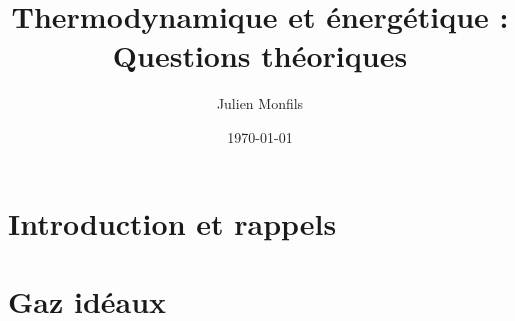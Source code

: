 \documentclass{article}
\title{Thermodynamique et énergétique : Questions théoriques}
\author{Julien Monfils}
\date{\today}
\begin{document}
\maketitle

\tableofcontents

\newpage


\section{Introduction et rappels}

\section{Gaz idéaux}

\end{document}
